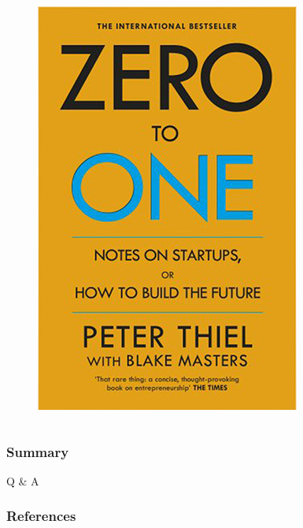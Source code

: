 \documentclass[aspectratio=169,xcolor=x11names,table]{beamer}
\begin{document}
\begin{frame}
\begin{columns}
\begin{column}{0.3\linewidth}
\begin{figure}
				\includegraphics[width=\columnwidth]{zero}
			\end{figure}
		\end{column}
	\end{columns}
\end{frame}


\begin{frame}
	\frametitle{Summary}
	\tableofcontents
\end{frame}

\begin{frame}
	\center
	\Huge Q \& A
\end{frame}

\begin{frame}[t,allowframebreaks]
	\frametitle{References}
	\tiny
	\printbibliography
\end{frame}
\end{document}
